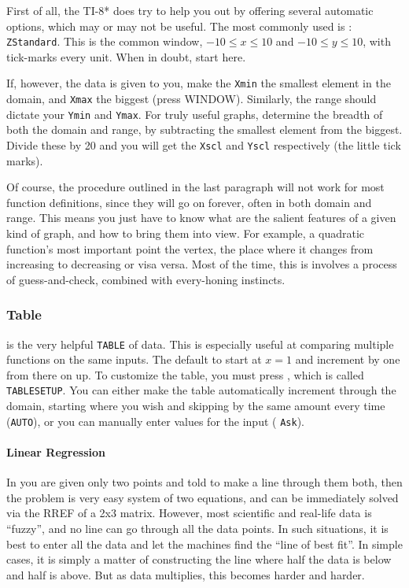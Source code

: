 First of all, the TI-8* does try to help you out by offering several automatic options, which 
may or may not be  useful.  The most commonly used is \Touche[style=function,principal=ZOOM]
\Touche[style=number, principal=6]: \texttt{ZStandard}.  This is the common window, 
$-10\le x\le 10$ and $-10\le y\le 10$, with tick-marks every unit.  When in doubt, start here.

If, however, the data is given to you, make the \texttt{Xmin} the smallest element in the domain,
and \texttt{Xmax} the biggest (press WINDOW).  Similarly, the range should dictate your \texttt{Ymin} and 
\texttt{Ymax}.  For truly useful graphs, determine the breadth of both the domain and range, 
by subtracting the smallest element from the biggest.  Divide these by 20 and you will get
the \texttt{Xscl} and \texttt{Yscl} respectively (the little tick marks).

Of course, the procedure outlined in the last paragraph will not work for most function definitions,
since they will go on forever, often in both domain and range.  This means you just have to know
what are the salient features of a given kind of graph, and how to bring them into view.  For example,
a quadratic function's most important point the vertex, the place where it changes from increasing
to decreasing or visa versa.  Most of the time, this is involves a process of guess-and-check,
combined with every-honing instincts.

\subsubsection{Table}
\Touche[style=function,principal=2ND] \Touche[style=function,principal={\small GRAPH}] is
the very helpful \texttt{TABLE} of data.  This is especially useful at comparing multiple functions on 
the same inputs.  The default to start at $x=1$ and increment by one from there on up.
To customize the table, you must press \Touche[style=function,principal=2ND] 
\Touche[style=function,principal={WIND}], which is called \texttt{TABLESETUP}.  
You can either make the table 
automatically increment through the domain, starting where you wish and skipping by the
same amount every time (\texttt{AUTO}), or you can manually enter values for the input (
\texttt{Ask}).


\paragraph{Linear Regression}
In you are given only two points and told to make a line through them both, then the problem is 
very easy system of two equations, and can be immediately solved via the RREF of a 2x3 matrix.
However, most scientific and real-life data is ``fuzzy'', and no line can go through all the data points.
In such situations, it is best to enter all the data and let the machines find the ``line of best fit''.  In 
simple cases, it is simply a matter of constructing the line where half the data is below and half is 
above.  But as data multiplies, this becomes harder and harder.


